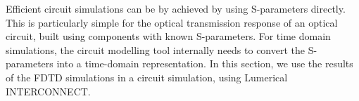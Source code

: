 \documentclass[journal]{spie}
\begin{document}
%
%
%

Efficient circuit simulations can be by achieved by using S-parameters directly.  This is particularly simple for the optical transmission response of an optical circuit, built using components with known S-parameters.  For time domain simulations, the circuit modelling tool internally needs to convert the S-parameters into a time-domain representation.  In this section, we use the results of the FDTD simulations in a circuit simulation, using Lumerical INTERCONNECT.  
\end{document}
